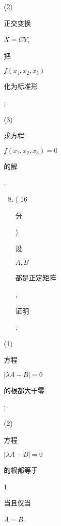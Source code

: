 \documentclass[10pt]{article}
\begin{document}
(2) \begin{CJK}{UTF8}{mj}正交变换\end{CJK} $X=C Y$, \begin{CJK}{UTF8}{mj}把\end{CJK} $f\left(x_{1}, x_{2}, x_{3}\right)$ \begin{CJK}{UTF8}{mj}化为标准形\end{CJK};

(3) \begin{CJK}{UTF8}{mj}求方程\end{CJK} $f\left(x_{1}, x_{2}, x_{3}\right)=0$ \begin{CJK}{UTF8}{mj}的解\end{CJK}.

\begin{enumerate}
  \setcounter{enumi}{7}
  \item ( 16 \begin{CJK}{UTF8}{mj}分\end{CJK}) \begin{CJK}{UTF8}{mj}设\end{CJK} $A, B$ \begin{CJK}{UTF8}{mj}都是正定矩阵\end{CJK}, \begin{CJK}{UTF8}{mj}证明\end{CJK}:
\end{enumerate}
(1) \begin{CJK}{UTF8}{mj}方程\end{CJK} $|\lambda A-B|=0$ \begin{CJK}{UTF8}{mj}的根都大于零\end{CJK};

(2) \begin{CJK}{UTF8}{mj}方程\end{CJK} $|\lambda A-B|=0$ \begin{CJK}{UTF8}{mj}的根都等于\end{CJK} 1 \begin{CJK}{UTF8}{mj}当且仅当\end{CJK} $A=B$.
\end{document}
